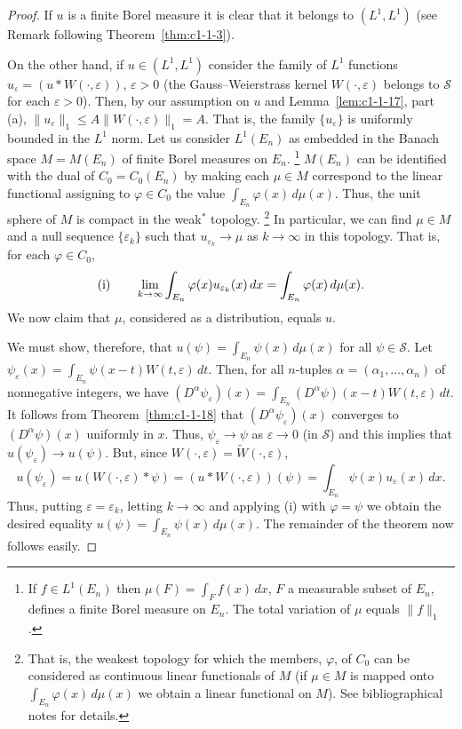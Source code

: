 \begin{proof}
If $u$ is a finite Borel measure it is clear that it belongs to
$(L^{1}, L^{1})$ (see Remark following Theorem~\ref{thm:c1-1-3}).

On the other hand, if $u \in (L^{1}, L^{1})$ consider the family of $L^{1}$
functions $u_{\varepsilon} = (u * W(\cdot, \varepsilon))$, $\varepsilon > 0$
(the Gauss--Weierstrass kernel $W(\cdot, \varepsilon)$ belongs to
$\mathscr{S}$ for each $\varepsilon > 0$). Then, by our assumption on $u$ and
Lemma~\ref{lem:c1-1-17}, part (a),
$\|u_{\varepsilon}\|_{1} \leq A\|W(\cdot, \varepsilon)\|_{1} = A$. That is,
the family $\{u_{\varepsilon}\}$ is uniformly bounded in the $L^{1}$ norm. Let
us consider $L^{1}(E_{n})$ as embedded in the Banach space $M = M(E_{n})$ of
finite Borel measures on $E_{n}$.%
\footnote{If $f \in L^{1}(E_{n})$ then $\mu(F) = \int_{F} f(x) \, dx$, $F$ a
measurable subset of $E_{n}$, defines a finite Borel measure on $E_{n}$. The
total variation of $\mu$ equals $\|f\|_{1}$.}
$M(E_{n})$ can be identified with the dual of $C_{0} = C_{0}(E_{n})$ by making
each $\mu \in M$ correspond to the linear functional assigning to
$\varphi \in C_{0}$ the value $\int_{E_{n}} \varphi(x) \, d\mu(x)$. Thus, the
unit sphere of $M$ is compact in the weak$^{*}$ topology.%
\footnote{That is, the weakest topology for which the members, $\varphi$, of
$C_{0}$ can be considered as continuous linear functionals of $M$ (if
$\mu \in M$ is mapped onto $\int_{E_{n}} \varphi(x) \, d\mu(x)$ we obtain a
linear functional on $M$). See bibliographical notes for details.}
In particular, we can find $\mu \in M$ and a null sequence
$\{\varepsilon_{k}\}$ such that $u_{\varepsilon_{k}} \to \mu$ as
$k \to \infty$ in this topology. That is, for each $\varphi \in C_{0}$,
\[
\textup{(i)}\qquad
\lim_{k\to\infty}\int_{E_{n}}\varphi(x)u_{\varepsilon_{k}}(x)\,dx
=\int_{E_{n}}\varphi(x)\,d\mu(x).
\]
We now claim that $\mu$, considered as a distribution, equals $u$.

We must show, therefore, that $u(\psi) = \int_{E_{n}} \psi(x) \, d\mu(x)$ for
all $\psi \in \mathscr{S}$. Let
$\psi_{\varepsilon}(x) = \int_{E_{n}} \psi(x - t)W(t, \varepsilon) \, dt$.
Then, for all $n$-tuples $\alpha = (\alpha_{1}, \ldots, \alpha_{n})$ of
nonnegative integers, we have
$(D^{\alpha}\psi_{\varepsilon})(x) = \int_{E_{n}} (D^{\alpha}\psi)(x - t)W(t, \varepsilon) \, dt$.
It follows from Theorem~\ref{thm:c1-1-18} that $(D^{\alpha}\psi_{\varepsilon})(x)$
converges to $(D^{\alpha}\psi)(x)$ uniformly in $x$. Thus,
$\psi_{\varepsilon} \to \psi$ as $\varepsilon \to 0$ (in $\mathscr{S}$) and
this implies that $u(\psi_{\varepsilon}) \to u(\psi)$. But, since
$W(\cdot, \varepsilon) = \tilde{W}(\cdot, \varepsilon)$,
\[
u(\psi_{\varepsilon})=u(W(\cdot,\varepsilon)*\psi)
=(u*W(\cdot,\varepsilon))(\psi)=\int_{E_{n}}\psi(x)u_{\varepsilon}(x)\,dx.
\]
Thus, putting $\varepsilon = \varepsilon_{k}$, letting $k \to \infty$ and
applying (i) with $\varphi = \psi$ we obtain the desired equality
$u(\psi) = \int_{E_{n}} \psi(x) \, d\mu(x)$. The remainder of the theorem now
follows easily.
\end{proof}

